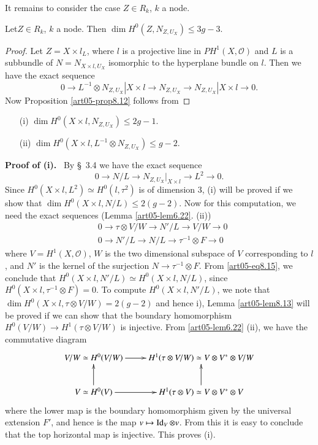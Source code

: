 It remains to consider the case $Z\in R_{k}$, $k$ a node.

\begin{proposition}\label{art05-prop8.12}
Let\pageoriginale $Z\in R_{k}$, $k$ a node. Then $\dim H^{0}(Z,N_{Z,U_{X}})\leq
3g-3$. 
\end{proposition}

\begin{proof}
Let $Z=X\times l_{L}$, where $l$ is a projective line in
$PH^{1}(X,\mathscr{O})$ and $L$ is a subbundle of $N=N_{X\times
l,U_{X}}$ isomorphic to the hyperplane bundle on $l$. Then we have the
exact sequence
$$
0\to L^{-1}\otimes N_{Z,U_{X}}|X\times l\to N_{Z,U_{X}}\to
N_{Z,U_{X}}|X\times l\to 0.
$$
Now Proposition \ref{art05-prop8.12} follows from
\end{proof}

\begin{lemma}\label{art05-lem8.13}
\begin{itemize}
\item[\rm(i)] $\dim H^{0}(X\times l,N_{Z,U_{X}})\leq 2g-1$.

\item[\rm(ii)] $\dim H^{0}(X\times l,L^{-1}\otimes N_{Z,U_{X}})\leq g-2$.
\end{itemize}
\end{lemma}

\noindent
{\bf Proof of (i).}~
By \S~3.4 we have the exact sequence
\setcounter{equation}{13}
\begin{equation}
0\to N/L\to N_{Z,U_{X}}|_{X\times l}\to L^{2}\to 0.\label{art05-eq8.14}
\end{equation}
Since $H^{0}(X\times l, L^{2})\simeq H^{0}(l,\tau^{2})$ is of
dimension 3, (i) will be proved if we show that $\dim H^{0}(X\times
l,N/L)\leq 2(g-2)$. Now for this computation, we need the exact
sequences (Lemma \ref{art05-lem6.22}. (ii))
\begin{align}
& 0\to \tau\otimes V/W\to N'/L\to V/W\to 0\label{art05-eq8.15}\\
& 0\to N'/L\to N/L\to \tau^{-1}\otimes F\to 0\label{art05-eq8.16}
\end{align}
where $V=H^{1}(X,\mathscr{O})$, $W$ is the two dimensional subspace of
$V$ corresponding to $l$, and $N'$ is the kernel of the surjection
$N\to \tau^{-1}\otimes F$. From \eqref{art05-eq8.15}, we conclude that
$H^{0}(X\times l,N'/L)\simeq H^{0}(X\times l,N/L)$, since
$H^{0}(X\times l,\tau^{-1}\otimes F)=0$. To compute $H^{0}(X\times
l,N'/L)$, we note that $\dim H^{0}(X\times l,\tau\otimes V/W)=2(g-2)$
and hence i), Lemma \ref{art05-lem8.13} will be proved if we can show
that the boundary homomorphism $H^{0}(V/W)\to H^{1}(\tau\otimes V/W)$
is injective. From \ref{art05-lem6.22} (ii), we have the commutative
diagram
\[
\xymatrix{
V/W\simeq H^{0}(V/W)\ar[r] & H^{1}(\tau\otimes V/W)\simeq V\otimes
V^{*}\otimes V/W\\
V\simeq H^{0}(V)\ar[u]\ar[r] & H^{1}(\tau\otimes V)\simeq V\otimes
V^{*}\otimes V\ar[u] 
}
\]
where the lower map is the boundary homomorphism given by the
universal extension $F'$, and hence is the map
$v\mapsto \operatorname{Id}_{V}\otimes v$. From this it is easy to conclude that the
top horizontal map is injective. This proves (i).
        
